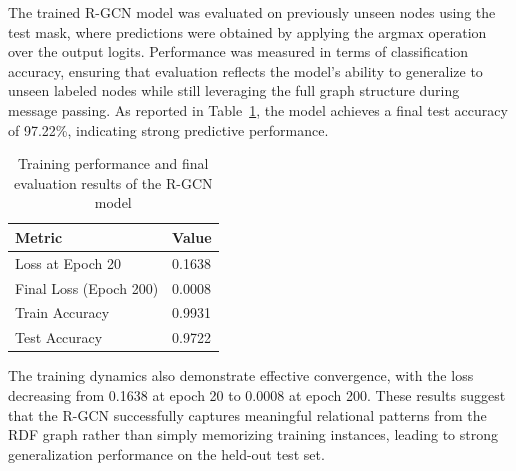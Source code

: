 \documentclass[runningheads]{llncs}
\begin{document}
The trained R-GCN model was evaluated on previously unseen nodes using the test mask, where predictions were obtained by applying the argmax operation over the output logits. Performance was measured in terms of classification accuracy, ensuring that evaluation reflects the model’s ability to generalize to unseen labeled nodes while still leveraging the full graph structure during message passing. As reported in Table~\ref{tab:results}, the model achieves a final test accuracy of 97.22\%, indicating strong predictive performance.
\begin{table}[h]
\centering
\caption{Training performance and final evaluation results of the R-GCN model}
\begin{tabular}{ll}
\hline
\textbf{Metric} & \textbf{Value} \\
\hline
Loss at Epoch 20 & 0.1638 \\
Final Loss (Epoch 200) & 0.0008 \\
Train Accuracy & 0.9931\\
Test Accuracy & 0.9722\\
\hline
\end{tabular}
\label{tab:results}
\end{table}
The training dynamics also demonstrate effective convergence, with the loss decreasing from 0.1638 at epoch 20 to 0.0008 at epoch 200. These results suggest that the R-GCN successfully captures meaningful relational patterns from the RDF graph rather than simply memorizing training instances, leading to strong generalization performance on the held-out test set.



\end{document}
